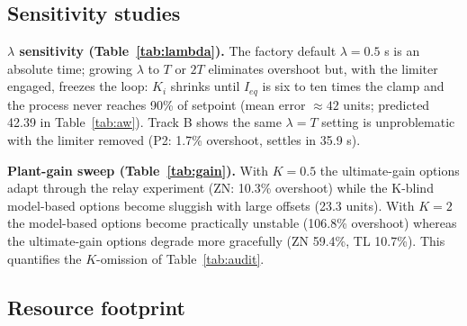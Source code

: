 \documentclass[10pt,twocolumn]{article}
\begin{document}
\subsection{Sensitivity studies}
\label{sec:gain}

\textbf{$\lambda$ sensitivity (Table~\ref{tab:lambda}).} The factory default $\lambda = 0.5$ s is an absolute time; growing $\lambda$ to $T$ or $2T$ eliminates overshoot but, with the limiter engaged, freezes the loop: $K_i$ shrinks until $I_{eq}$ is six to ten times the clamp and the process never reaches 90\% of setpoint (mean error $\approx 42$ units; predicted 42.39 in Table~\ref{tab:aw}). Track B shows the same $\lambda = T$ setting is unproblematic with the limiter removed (P2: 1.7\% overshoot, settles in 35.9 s).

\begin{table}[t]
\centering
\caption{$\lambda$ sensitivity on P2 ($T{=}10$ s, $L{=}5$ s), Track A. $t_r$ ``--'' denotes failure to reach 90\% of setpoint; no configuration settles within the 2\% band.}
\label{tab:lambda}
\footnotesize
\setlength{\tabcolsep}{3pt}

\end{table}

\textbf{Plant-gain sweep (Table~\ref{tab:gain}).} With $K = 0.5$ the ultimate-gain options adapt through the relay experiment (ZN: 10.3\% overshoot) while the K-blind model-based options become sluggish with large offsets (23.3 units). With $K = 2$ the model-based options become practically unstable (106.8\% overshoot) whereas the ultimate-gain options degrade more gracefully (ZN 59.4\%, TL 10.7\%). This quantifies the $K$-omission of Table~\ref{tab:audit}.

\begin{table}[t]
\centering
\caption{Plant-gain sweep on P2 dynamics ($K \in \{0.5, 2.0\}$), Track A.}
\label{tab:gain}
\small
\setlength{\tabcolsep}{3pt}

\end{table}

\subsection{Resource footprint}
\end{document}
